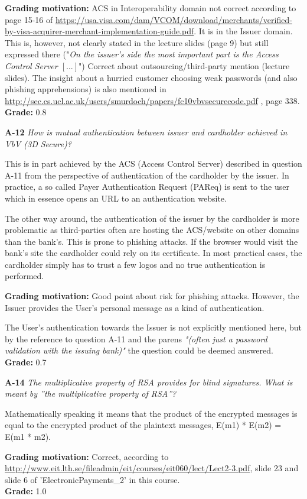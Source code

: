 \documentclass[a4paper]{article}
\newcommand{\Q}[2]{
  \vspace{10pt} \textbf{#1} \textit{#2}
 }
\newcommand{\A}[1]{ #1 }
\newcommand{\Grade}[2]{ 
  \textbf{Grading motivation:} #2 \\ 
  \hspace*{\fill} \textbf{Grade:} #1 
}
\begin{document}
\Grade{0.8}{
  ACS in Interoperability domain not correct according to page 15-16 of
  \url{https://usa.visa.com/dam/VCOM/download/merchants/verified-by-visa-acquirer-merchant-implementation-guide.pdf}. 
  It is in the Issuer domain. This is, however, 
  not clearly stated in the lecture slides (page 9) but still expressed there 
  ("\textit{On the issuer's side the most important part is the Access Control Server 
  $[...]$}")
  Correct about outsourcing/third-party mention (lecture slides).
  The insight about a hurried customer choosing weak passwords 
  (and also phishing apprehensions) is also
  mentioned in 
  \url{http://sec.cs.ucl.ac.uk/users/smurdoch/papers/fc10vbvsecurecode.pdf}
  , page 338.
}

\Q{A-12} {How is mutual authentication between issuer and cardholder achieved in
VbV (3D Secure)?}

\A{
  This is in part achieved by the ACS (Access Control Server) described in question A-11
  from the perspective of authentication of the cardholder by the issuer. In practice, a so called
  Payer Authentication Request (PAReq) is sent to the user which in essence opens an URL to
  an authentication website.

  The other way around, the authentication of the issuer by the cardholder is more problematic as
  third-parties often are hosting the ACS/website on other domains than the bank’s. This is prone
  to phishing attacks. If the browser would visit the bank’s site the cardholder could rely on its
  certificate. In most practical cases, the cardholder simply has to trust a few logos and no true
  authentication is performed.
}

\Grade{0.7}{
  Good point about risk for phishing attacks. However,
  the Issuer provides the User's personal message
  as a kind of authentication.

  The User's authentication towards the Issuer is not explicitly mentioned here,
  but by the reference to question A-11 and the parens 
  \textit{"(often just a password validation with the issuing bank)"}
  the question could be deemed answered.
}

\Q{A-14} {The multiplicative property of RSA provides for blind signatures. What is meant by ”the multiplicative property of RSA”?}

\A{
  Mathematically speaking it means that the product of the encrypted messages is equal
  to the encrypted product of the plaintext messages, E(m1) * E(m2) = E(m1 * m2).
}

\Grade{1.0}{
  Correct, according to \url{http://www.eit.lth.se/fileadmin/eit/courses/eit060/lect/Lect2-3.pdf}, slide 23 and slide 6 of 'ElectronicPayments\_2' in this course. 
}
\end{document}
